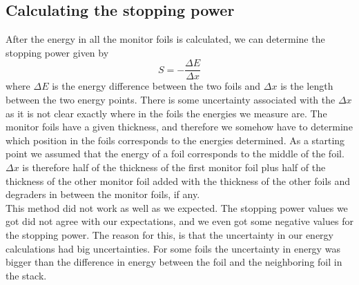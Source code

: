 \subsection{Calculating the stopping power}
After the energy in all the monitor foils is calculated, we can determine the stopping power given by
\begin{equation}
    S = -\frac{\Delta E}{\Delta x}
\end{equation}
where $\Delta E$ is the energy difference between the two foils and $\Delta x$ is the length between the two energy points. There is some uncertainty associated with the $\Delta x$ as it is not clear exactly where in the foils the energies we measure are. The monitor foils have a given thickness, and therefore we somehow have to determine which position in the foils corresponds to the energies determined. As a starting point we assumed that the energy of a foil corresponds to the middle of the foil. $\Delta x$ is therefore half of the thickness of the first monitor foil plus half of the thickness of the other monitor foil added with the thickness of the other foils and degraders in between the monitor foils, if any. 
\vspace{3mm}
\\
This method did not work as well as we expected. The stopping power values we got did not agree with our expectations, and we even got some negative values for the stopping power. The reason for this, is that the uncertainty in our energy calculations had big uncertainties. For some foils the uncertainty in energy was bigger than the difference in energy between the foil and the neighboring foil in the stack.










